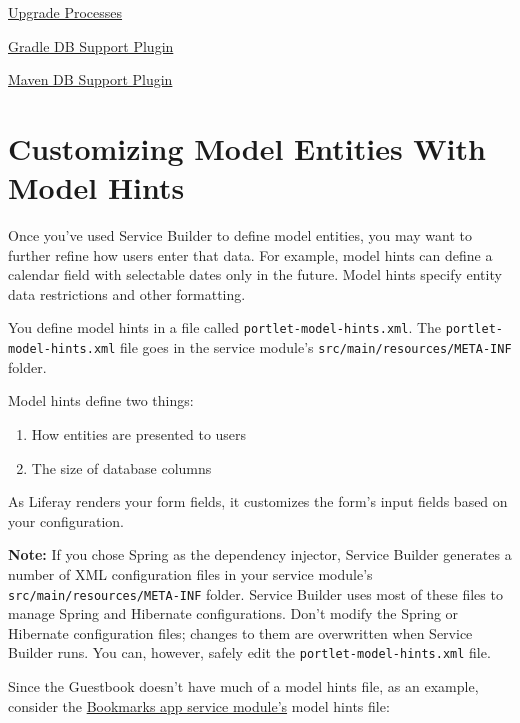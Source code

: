 \href{/docs/7-2/frameworks/-/knowledge_base/f/upgrade-processes}{Upgrade
Processes}

\href{/docs/7-2/reference/-/knowledge_base/r/db-support-gradle-plugin}{Gradle
DB Support Plugin}

\href{/docs/7-2/reference/-/knowledge_base/r/db-support-plugin}{Maven DB
Support Plugin}

\chapter{Customizing Model Entities With Model
Hints}\label{customizing-model-entities-with-model-hints}

Once you've used Service Builder to define model entities, you may want
to further refine how users enter that data. For example, model hints
can define a calendar field with selectable dates only in the future.
Model hints specify entity data restrictions and other formatting.

You define model hints in a file called
\texttt{portlet-model-hints.xml}. The \texttt{portlet-model-hints.xml}
file goes in the service module's \texttt{src/main/resources/META-INF}
folder.

Model hints define two things:

\begin{enumerate}
\def\labelenumi{\arabic{enumi}.}
\item
  How entities are presented to users
\item
  The size of database columns
\end{enumerate}

As Liferay renders your form fields, it customizes the form's input
fields based on your configuration.

\noindent\hrulefill

\textbf{Note:} If you chose Spring as the dependency injector, Service
Builder generates a number of XML configuration files in your service
module's \texttt{src/main/resources/META-INF} folder. Service Builder
uses most of these files to manage Spring and Hibernate configurations.
Don't modify the Spring or Hibernate configuration files; changes to
them are overwritten when Service Builder runs. You can, however, safely
edit the \texttt{portlet-model-hints.xml} file.

\noindent\hrulefill

Since the Guestbook doesn't have much of a model hints file, as an
example, consider the
\href{https://repository.liferay.com/nexus/content/repositories/liferay-public-releases/com/liferay/com.liferay.bookmarks.service/}{Bookmarks
app service module's} model hints file:

